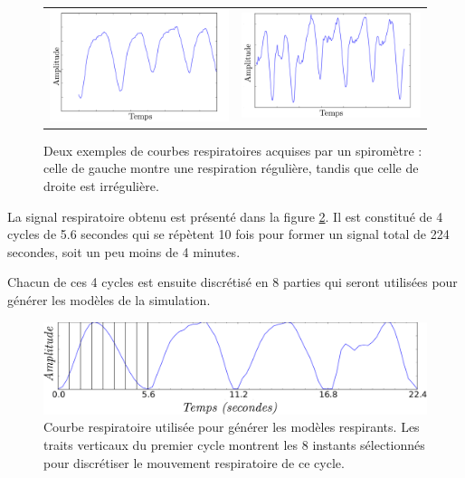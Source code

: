 \begin{figure}
 \centering
 \begin{tabular}{c c}
 \includegraphics[width=8cm]{images/respiReguliere} &
 \includegraphics[width=8cm]{images/respiIrreguliere}
 \end{tabular}
 \caption[Exemple de courbes respiratoires régulière et irrégulière]{Deux exemples de courbes respiratoires acquises par un spiromètre : celle de gauche montre une respiration régulière, tandis que celle de droite est irrégulière.}
 \label{fig:variabCycle}
\end{figure}


La signal respiratoire obtenu est présenté dans la figure \ref{fig:cycleRespi}. Il est constitué de 4 cycles de 5.6 secondes qui se répètent 10 fois pour former un signal total de 224 secondes, soit un peu moins de 4 minutes. 

Chacun de ces 4 cycles est ensuite discrétisé en 8 parties qui seront utilisées pour générer les modèles de la simulation. 


\begin{figure}
 \centering
 \includegraphics[width=12cm]{images/courbesRespi}

 \caption[signal respiratoire utilisé pour les modèles de la base de données]{Courbe respiratoire utilisée pour générer les modèles respirants. Les traits verticaux du premier cycle montrent les 8 instants sélectionnés pour discrétiser le mouvement respiratoire de ce cycle.}
 \label{fig:cycleRespi}
\end{figure}

